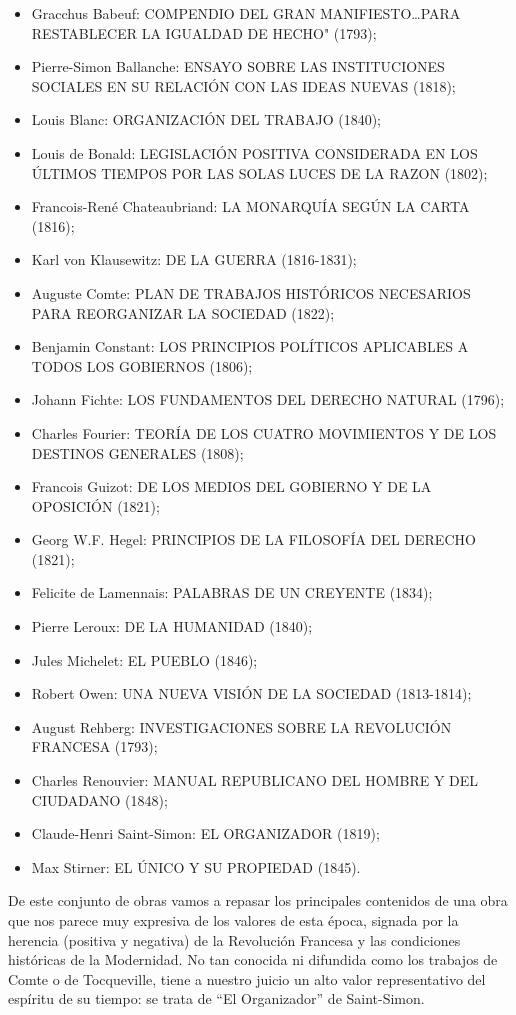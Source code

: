 \documentclass[
]{book}
\providecommand{\tightlist}{%
  \setlength{\itemsep}{0pt}\setlength{\parskip}{0pt}}
\begin{document}
\begin{itemize}
\tightlist
\item
  Gracchus Babeuf: COMPENDIO DEL GRAN MANIFIESTO\ldots PARA RESTABLECER LA IGUALDAD DE HECHO" (1793);
\item
  Pierre-Simon Ballanche: ENSAYO SOBRE LAS INSTITUCIONES SOCIALES EN SU RELACIÓN CON LAS IDEAS NUEVAS (1818);
\item
  Louis Blanc: ORGANIZACIÓN DEL TRABAJO (1840);
\item
  Louis de Bonald: LEGISLACIÓN POSITIVA CONSIDERADA EN LOS ÚLTIMOS TIEMPOS POR LAS SOLAS LUCES DE LA RAZON (1802);
\item
  Francois-René Chateaubriand: LA MONARQUÍA SEGÚN LA CARTA (1816);
\item
  Karl von Klausewitz: DE LA GUERRA (1816-1831);
\item
  Auguste Comte: PLAN DE TRABAJOS HISTÓRICOS NECESARIOS PARA REORGANIZAR LA SOCIEDAD (1822);
\item
  Benjamin Constant: LOS PRINCIPIOS POLÍTICOS APLICABLES A TODOS LOS GOBIERNOS (1806);
\item
  Johann Fichte: LOS FUNDAMENTOS DEL DERECHO NATURAL (1796);
\item
  Charles Fourier: TEORÍA DE LOS CUATRO MOVIMIENTOS Y DE LOS DESTINOS GENERALES (1808);
\item
  Francois Guizot: DE LOS MEDIOS DEL GOBIERNO Y DE LA OPOSICIÓN (1821);
\item
  Georg W.F. Hegel: PRINCIPIOS DE LA FILOSOFÍA DEL DERECHO (1821);
\item
  Felicite de Lamennais: PALABRAS DE UN CREYENTE (1834);
\item
  Pierre Leroux: DE LA HUMANIDAD (1840);
\item
  Jules Michelet: EL PUEBLO (1846);
\item
  Robert Owen: UNA NUEVA VISIÓN DE LA SOCIEDAD (1813-1814);
\item
  August Rehberg: INVESTIGACIONES SOBRE LA REVOLUCIÓN FRANCESA (1793);
\item
  Charles Renouvier: MANUAL REPUBLICANO DEL HOMBRE Y DEL CIUDADANO (1848);
\item
  Claude-Henri Saint-Simon: EL ORGANIZADOR (1819);
\item
  Max Stirner: EL ÚNICO Y SU PROPIEDAD (1845).
\end{itemize}

De este conjunto de obras vamos a repasar los principales contenidos de una obra que nos parece muy expresiva de los valores de esta época, signada por la herencia (positiva y negativa) de la Revolución Francesa y las condiciones históricas de la Modernidad. No tan conocida ni difundida como los trabajos de Comte o de Tocqueville, tiene a nuestro juicio un alto valor representativo del espíritu de su tiempo: se trata de ``El Organizador'' de Saint-Simon.
\end{document}
